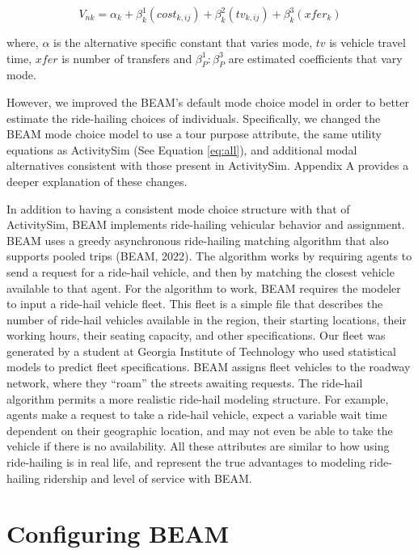 \documentclass[fancy, masters]{byuthesis}
\begin{document}
\begin{equation}
  V_{nk} = \alpha_{k} + \beta_k^1(cost_{k,ij}) + \beta_k^2(tv_{k,ij}) + \beta_k^3(xfer_{k}) \label{eq:beam}
\end{equation}

where, \(\alpha\) is the alternative specific constant that varies mode, \(tv\) is vehicle travel time, \(xfer\) is number of transfers and \(\beta_{P}^1:\beta_{P}^{3}\) are estimated coefficients that vary mode.

However, we improved the BEAM's default mode choice model in order to better estimate the ride-hailing choices of individuals. Specifically, we changed the BEAM mode choice model to use a tour purpose attribute, the same utility equations as ActivitySim (See Equation \eqref{eq:all}), and additional modal alternatives consistent with those present in ActivitySim. Appendix A provides a deeper explanation of these changes.

In addition to having a consistent mode choice structure with that of ActivitySim, BEAM implements ride-hailing vehicular behavior and assignment. BEAM uses a greedy asynchronous ride-hailing matching algorithm that also supports pooled trips (BEAM, 2022). The algorithm works by requiring agents to send a request for a ride-hail vehicle, and then by matching the closest vehicle available to that agent. For the algorithm to work, BEAM requires the modeler to input a ride-hail vehicle fleet. This fleet is a simple file that describes the number of ride-hail vehicles available in the region, their starting locations, their working hours, their seating capacity, and other specifications. Our fleet was generated by a student at Georgia Institute of Technology who used statistical models to predict fleet specifications. BEAM assigns fleet vehicles to the roadway network, where they ``roam'' the streets awaiting requests. The ride-hail algorithm permits a more realistic ride-hail modeling structure. For example, agents make a request to take a ride-hail vehicle, expect a variable wait time dependent on their geographic location, and may not even be able to take the vehicle if there is no availability. All these attributes are similar to how using ride-hailing is in real life, and represent the true advantages to modeling ride-hailing ridership and level of service with BEAM.

\hypertarget{configuring-beam}{%
\section{Configuring BEAM}\label{configuring-beam}}
\end{document}
